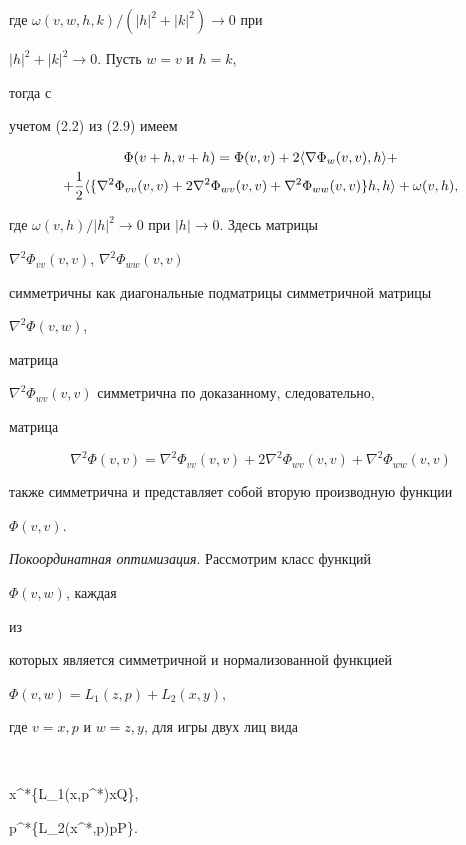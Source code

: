 где $\omega(v,w,h,k)/(|h|^2+|k|^2)\to 0$ при


$|h|^2+|k|^2\to 0$. Пусть $w=v$ и $h=k$,


тогда с


учетом (2.2) из (2.9) имеем


\begin{multline*}


\Phi(v+h,v+h)=\Phi(v,v)+2\la\nabla\Phi_w(v,v),h\ra+\\


+\frac{1}{2}\la\{\nabla^2\Phi_{vv}(v,v)+2\nabla^2\Phi_{wv}


(v,v)+\nabla^2\Phi_{ww}(v,v)\}h,h\ra+\omega(v,h),


\end{multline*}


где $\omega(v,h)/|h|^2\to 0$ при $|h|\to 0$. Здесь матрицы


$\nabla^2\Phi_{vv}(v,v)$, $\nabla^2\Phi_{ww}(v,v)$


симметричны как диагональные подматрицы симметричной матрицы


$\nabla^2\Phi(v,w)$,


матрица


$\nabla^2\Phi_{wv}(v,v)$ симметрична по доказанному, следовательно,


матрица


$$


\nabla^2\Phi(v,v)=\nabla^2\Phi_{vv}(v,v)+2\nabla^2\Phi_{wv}(v,v)


+\nabla^2\Phi_{ww}(v,v)


$$


также симметрична и представляет собой вторую производную функции


$\Phi(v,v)$.


\medskip





{\it Покоординатная оптимизация}. Рассмотрим класс функций


$\Phi(v,w)$, каждая


из


которых является симметричной и нормализованной функцией


$\Phi(v,w)=L_1(z,p)+L_2(x,y)$,


где $v=x,p$ и $w=z,y$, для игры двух лиц вида


$$


x^*\in\argmin\{L_1(x,p^*)\mid x\in Q\},\quad


p^*\in\argmin\{L_2(x^*,p)\mid p\in P\}.


